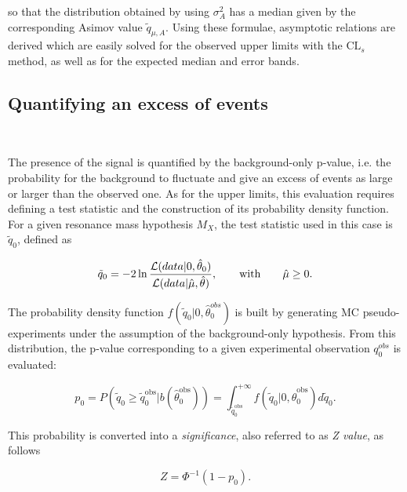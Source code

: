 so that the distribution obtained by using $\sigma_A^2$ has a median given by the corresponding Asimov value $\tilde{q}_{\mu,A}$. 
Using these formulae, asymptotic relations are derived which are easily solved for the observed upper limits with the $\mathrm{CL}_s$ method,
as well as for the expected median and error bands.

\subsection{Quantifying an excess of events}~\label{subsec:pvalue}

The presence of the signal is quantified by the background-only p-value, i.e. the probability for the background to fluctuate
and give an excess of events as large or larger than the observed one.
As for the upper limits, this evaluation requires defining a test statistic and the construction of its probability density function.
For a given resonance mass hypothesis $M_X$, the test statistic used in this case is $\tilde{q}_0$, defined as

\begin{equation}
\tilde{q}_0 = -2\ln\frac{{\cal L}(data | 0,\hat{\theta}_0)}{{\cal L}( data | \hat{\mu},\hat{\theta})},\qquad \mathrm{with} \qquad \hat{\mu} \geq 0.
\end{equation}

The probability density function $f(\tilde{q}_0|0,\hat{\theta}_0^{obs})$ is built by generating MC pseudo-experiments under the assumption of the background-only hypothesis.
From this distribution, the p-value corresponding to a given experimental observation $q_0^{obs}$ is evaluated:

\begin{equation}
p_0 = P(\tilde{q}_0 \geq \tilde{q}_0^\mathrm{obs}|b(\hat{\theta}_0^\mathrm{obs})) = \int_{\tilde{q}_0^\mathrm{obs}}^{+\infty} f(\tilde{q}_0|0,\hat{\theta}_0^\mathrm{obs})d\tilde{q}_0.
\end{equation}

This probability is converted into a \textit{significance}, also referred to as \textit{Z value}, as follows

\begin{equation}
Z = \Phi^{-1} (1-p_0).
\end{equation}

